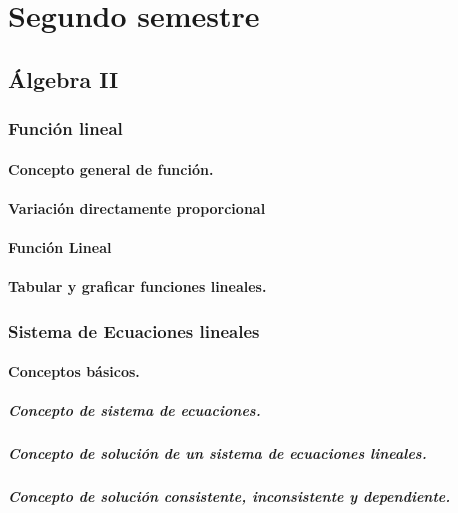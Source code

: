 \part{Segundo semestre}
\chapter{Álgebra II}


\section{Función lineal} %
\subsection{Concepto general de función.}
\subsection{Variación directamente proporcional}
\subsection{Función Lineal}
\subsection{Tabular y graficar funciones lineales.}








\section{Sistema de Ecuaciones lineales} %
\subsection{Conceptos básicos.}
\subsubsection{Concepto de sistema de ecuaciones.}
\subsubsection{Concepto de solución de un sistema de ecuaciones lineales.}
\subsubsection{Concepto de solución consistente, inconsistente y dependiente.}
